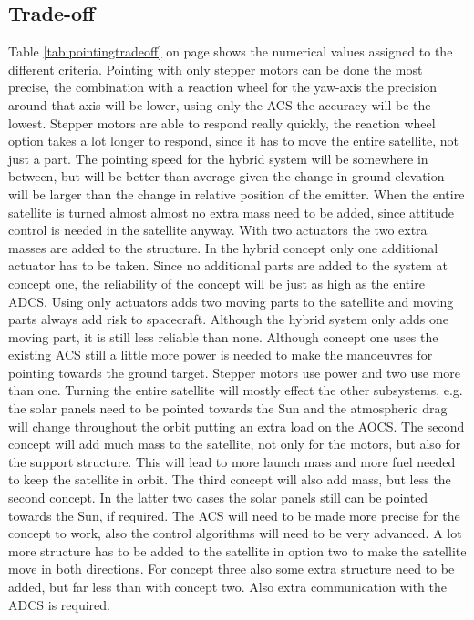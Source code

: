 \subsection{Trade-off}
Table \ref{tab:pointingtradeoff} on page \pageref{tab:pointingtradeoff} shows the numerical values assigned to the different criteria. 
Pointing with only stepper motors can be done the most precise, the combination with a reaction wheel for the yaw-axis the precision around that axis will be lower, using only the \ac{ACS} the accuracy will be the lowest. 
Stepper motors are able to respond really quickly, the reaction wheel option takes a lot longer to respond, since it has to move the entire satellite, not just a part. The pointing speed for the hybrid system will be somewhere in between, but will be better than average given the change in ground elevation will be larger than the change in relative position of the emitter.
When the entire satellite is turned almost almost no extra mass need to be added, since attitude control is needed in the satellite anyway. With two actuators the two extra masses are added to the structure. In the hybrid concept only one additional actuator has to be taken.
Since no additional parts are added to the system at concept one, the reliability of the concept will be just as high as the entire \ac{ADCS}. Using only actuators adds two moving parts to the satellite and moving parts always add risk to spacecraft. Although the hybrid system only adds one moving part, it is still less reliable than none.
Although concept one uses the existing \ac{ACS} still a little more power is needed to make the manoeuvres for pointing towards the ground target. Stepper motors use power and two use more than one.
Turning the entire satellite will mostly effect the other subsystems, e.g. the solar panels need to be pointed towards the Sun and the atmospheric drag will change throughout the orbit putting an extra load on the \ac{AOCS}. The second concept will add much mass to the satellite, not only for the motors, but also for the support structure. This will lead to more launch mass and more fuel needed to keep the satellite in orbit. The third concept will also add mass, but less the second concept. In the latter two cases the solar panels still can be pointed towards the Sun, if required.
The \ac{ACS} will need to be made more precise for the concept to work, also the control algorithms will need to be very advanced. A lot more structure has to be added to the satellite in option two to make the satellite move in both directions. For concept three also some extra structure need to be added, but far less than with concept two. Also extra communication with the \ac{ADCS} is required.

